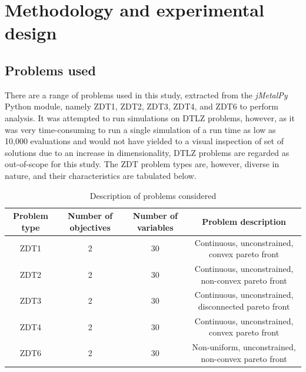 \documentclass[sigconf,nonacm]{acmart}
\begin{document}
\section{Methodology and experimental design}
\subsection{Problems used}
There are a range of problems used in this study, extracted from the \textit{jMetalPy} \cite{jmetalpy2019} Python module, namely ZDT1, ZDT2, ZDT3, ZDT4, and ZDT6 to perform analysis. It was attempted to run simulations on DTLZ problems, however, as it was very time-consuming to run a single simulation of a run time as low as 10,000 evaluations and would not have yielded to a visual inspection of set of solutions due to an increase in dimensionality, DTLZ problems are regarded as out-of-scope for this study. The ZDT problem types are, however, diverse in nature, and their characteristics are tabulated below.\\
\begin{table}[t]
\centering
\begin{tabular}{|c|c|c|c|}
\hline
Problem type & Number of objectives & Number of variables & Problem description \\
\hline
ZDT1 & 2 & 30 & Continuous, unconstrained, convex pareto front \\
ZDT2 & 2 & 30 & Continuous, unconstrained, non-convex pareto front \\
ZDT3 & 2 & 30 & Continuous, unconstrained, disconnected pareto front \\
ZDT4 & 2 & 30 & Continuous, unconstrained, convex pareto front \\
ZDT6 & 2 & 30 & Non-uniform, unconstrained, non-convex pareto front \\
\hline
\end{tabular}
\caption{Description of problems considered}
\end{table}
\end{document}
